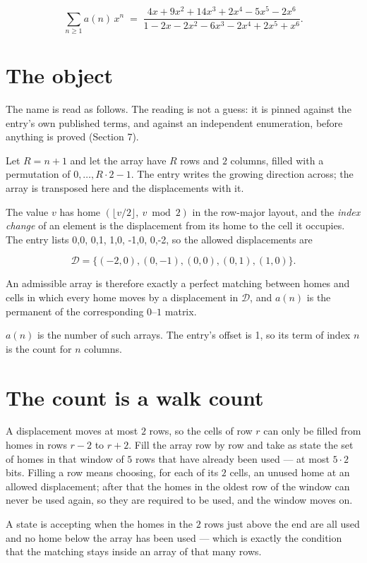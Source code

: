 \documentclass[11pt]{article}
\theoremstyle{definition}
\begin{document}
\[\sum_{n \ge 1} a(n)\,x^n \;=\; \frac{4x + 9x^{2} + 14x^{3} + 2x^{4} - 5x^{5} - 2x^{6}}{1 - 2x - 2x^{2} - 6x^{3} - 2x^{4} + 2x^{5} + x^{6}}.\]

\section{The object}

The name is read as follows. The reading is not a guess: it is pinned against the entry's own published terms, and against an independent enumeration, before anything is proved (Section 7).

Let $R = n + 1$ and let the array have $R$ rows and $2$ columns, filled with a permutation of $0,\dots,R\cdot2-1$. The entry writes the growing direction across; the array is transposed here and the displacements with it.

The value $v$ has home $(\lfloor v/2\rfloor,\ v \bmod 2)$ in the row-major layout, and the {\itshape index change} of an element is the displacement from its home to the cell it occupies. The entry lists 0,0, 0,1, 1,0, -1,0, 0,-2, so the allowed displacements are

\[\mathcal{D} = \{(-2,0), (0,-1), (0,0), (0,1), (1,0)\}.\]

An admissible array is therefore exactly a perfect matching between homes and cells in which every home moves by a displacement in $\mathcal{D}$, and $a(n)$ is the permanent of the corresponding $0$--$1$ matrix.

$a(n)$ is the number of such arrays. The entry's offset is 1, so its term of index $n$ is the count for $n$ columns.

\section{The count is a walk count}

A displacement moves at most $2$ rows, so the cells of row $r$ can only be filled from homes in rows $r-2$ to $r+2$. Fill the array row by row and take as state the set of homes in that window of $5$ rows that have already been used --- at most $5\cdot2$ bits. Filling a row means choosing, for each of its $2$ cells, an unused home at an allowed displacement; after that the homes in the oldest row of the window can never be used again, so they are required to be used, and the window moves on.

A state is accepting when the homes in the $2$ rows just above the end are all used and no home below the array has been used --- which is exactly the condition that the matching stays inside an array of that many rows.
\end{document}
